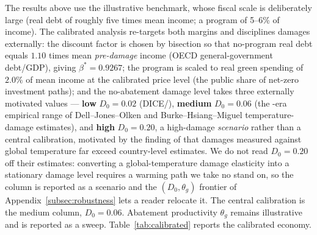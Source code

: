 \documentclass[12pt]{article}
\begin{document}
The results above use the illustrative benchmark, whose fiscal scale is
deliberately large (real debt of roughly five times mean income; a program of
5--6\% of income). The calibrated analysis re-targets both margins and
disciplines damages externally: the discount factor is chosen by bisection so
that no-program real debt equals $1.10$ times mean \emph{pre-damage} income
(OECD general-government debt/GDP), giving $\beta^{*}=0.9267$; the program is
scaled to real green spending of $2.0\%$ of mean income at the calibrated
price level (the public share of net-zero investment paths); and the
no-abatement damage level takes three externally motivated values ---
\textbf{low} $D_0=0.02$ (DICE/\citealp{nordhaus2017}), \textbf{medium}
$D_0=0.06$ (the \citealp{golosov2014}-era empirical range of
Dell--Jones--Olken and Burke--Hsiang--Miguel temperature-damage estimates),
and \textbf{high} $D_0=0.20$, a high-damage \emph{scenario} rather than a
central calibration, motivated by the finding of \citet{bilalkanzig2024} that
damages measured against global temperature far exceed country-level
estimates. We do not read $D_0=0.20$ off their estimates: converting a
global-temperature damage elasticity into a stationary damage level requires
a warming path we take no stand on, so the column is reported as a scenario
and the $(D_0,\theta_g)$ frontier of
Appendix~\ref{subsec:robustness} lets a reader relocate it. The central
calibration is the medium column, $D_0=0.06$. Abatement productivity
$\theta_g$ remains illustrative and is reported as a sweep.
Table~\ref{tab:calibrated} reports the calibrated economy.
\end{document}
